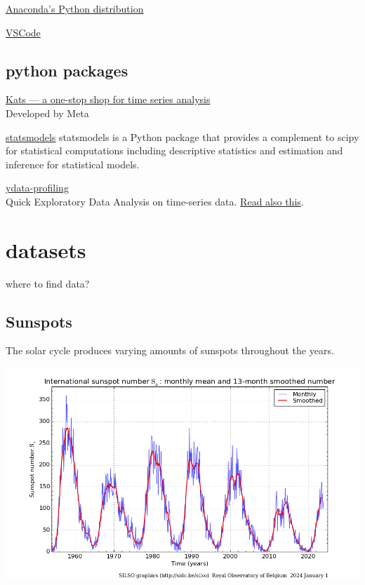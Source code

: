 \documentclass[
  letterpaper,
  DIV=11,
  numbers=noendperiod,
  oneside]{scrreprt}
\begin{document}
\href{https://www.anaconda.com/download}{Anaconda's Python distribution}

\href{https://code.visualstudio.com/download}{VSCode}

\hypertarget{python-packages}{%
\section{python packages}\label{python-packages}}

\href{https://engineering.fb.com/2021/06/21/open-source/kats/}{Kats ---
a one-stop shop for time series analysis}\\
Developed by Meta

\href{https://www.statsmodels.org/stable/}{statsmodels} statsmodels is a
Python package that provides a complement to scipy for statistical
computations including descriptive statistics and estimation and
inference for statistical models.

\href{https://ydata-profiling.ydata.ai/docs/master/pages/use_cases/time_series_datasets.html}{ydata-profiling}\\
Quick Exploratory Data Analysis on time-series data.
\href{https://towardsdatascience.com/how-to-do-an-eda-for-time-series-cbb92b3b1913}{Read
also this}.

\hypertarget{datasets}{%
\chapter{datasets}\label{datasets}}

where to find data?

\hfill\break

\hypertarget{sunspots}{%
\section{Sunspots}\label{sunspots}}

The solar cycle produces varying amounts of sunspots throughout the
years.

\includegraphics{technical-stuff/sunspot.png}
\end{document}
